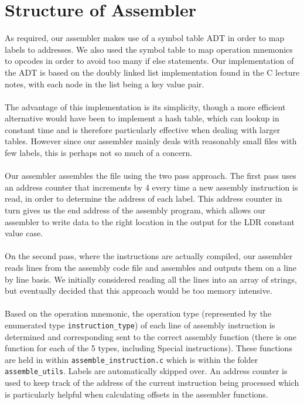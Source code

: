 \documentclass[11pt,twoside]{article}
\begin{document}
\section{Structure of Assembler}
As required, our assembler makes use of a symbol table ADT in order to map labels to addresses. We also used the symbol table to map operation mnemonics to opcodes in order to avoid too many if else statements. Our implementation of the ADT is based on the doubly linked list implementation found in the C lecture notes, with each node in the list being a key value pair.\\\\
The advantage of this implementation is its simplicity, though a more efficient alternative would have been to implement a hash table, which can lookup in constant time and is therefore particularly effective when dealing with larger tables. However since our assembler mainly deals with reasonably small files with few labels, this is perhaps not so much of a concern.\\\\
Our assembler assembles the file using the two pass approach. The first pass uses an address counter that increments by 4 every time a new assembly instruction is read, in order to determine the address of each label. This address counter in turn gives us the end address of the assembly program, which allows our assembler to write data to the right location in the output for the LDR constant value case.\\\\
On the second pass, where the instructions are actually compiled, our assembler reads lines from the assembly code file and assembles and outputs them on a line by line basis. We initially considered reading all the lines into an array of strings, but eventually decided that this approach would be too memory intensive.\\\\
Based on the operation mnemonic, the operation type (represented by the enumerated type \texttt{instruction\_type}) of each line of assembly instruction is determined and corresponding sent to the correct assembly function (there is one function for each of the 5 types, including Special instructions). These functions are held in within \texttt{assemble\_instruction.c} which is within the folder \texttt{assemble\_utils}. Labels are automatically skipped over. An address counter is used to keep track of the address of the current instruction being processed which is particularly helpful when calculating offsets in the assembler functions.\\\\
\end{document}
